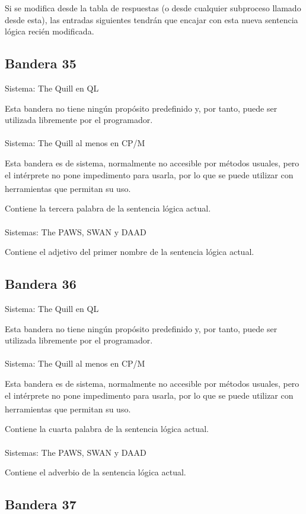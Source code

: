 \documentclass[11pt, a5paper]{article}
\newcommand{\quill}{\textsf{The Quill}\xspace}
\newcommand{\paw}{\textsf{The PAWS}\xspace}
\newcommand{\swan}{\textsf{SWAN}\xspace}
\newcommand{\daad}{\textsf{DAAD}\xspace}
\newcommand{\sistema}[1]{\noindent Sistema: #1 \nopagebreak}
\newcommand{\sistemas}[1]{\noindent Sistemas: #1 \nopagebreak}
\newcommand{\footnoteref}[2]{\hyperref[#1]{\textsuperscript{#2}}}
\begin{document}
Si se modifica desde la tabla de respuestas (o desde cualquier subproceso llamado desde esta), las entradas siguientes tendrán que encajar con esta nueva sentencia lógica recién modificada.

\subsection{Bandera 35}

\sistema{\quill en QL}

Esta bandera no tiene ningún propósito predefinido y, por tanto, puede ser utilizada libremente por el programador.
\\\ \\
\sistema{\quill al menos en CP/M\cite{QuillQDB}}

Esta bandera es de sistema, normalmente no accesible por métodos usuales, pero el intérprete no pone impedimento para usarla, por lo que se puede utilizar con herramientas que permitan su uso\footnoteref{sysflagCPM}{\thesysflagCPM}.

Contiene la tercera palabra de la sentencia lógica actual.
\\\ \\
\sistemas{\paw, \swan y \daad}

Contiene el adjetivo del primer nombre de la sentencia lógica actual.

\subsection{Bandera 36}

\sistema{\quill en QL}

Esta bandera no tiene ningún propósito predefinido y, por tanto, puede ser utilizada libremente por el programador.
\\\ \\
\sistema{\quill al menos en CP/M\cite{QuillQDB}}

Esta bandera es de sistema, normalmente no accesible por métodos usuales, pero el intérprete no pone impedimento para usarla, por lo que se puede utilizar con herramientas que permitan su uso\footnoteref{sysflagCPM}{\thesysflagCPM}.

Contiene la cuarta palabra de la sentencia lógica actual.
\\\ \\
\sistemas{\paw, \swan y \daad}

Contiene el adverbio de la sentencia lógica actual.

\subsection{Bandera 37}
\end{document}

